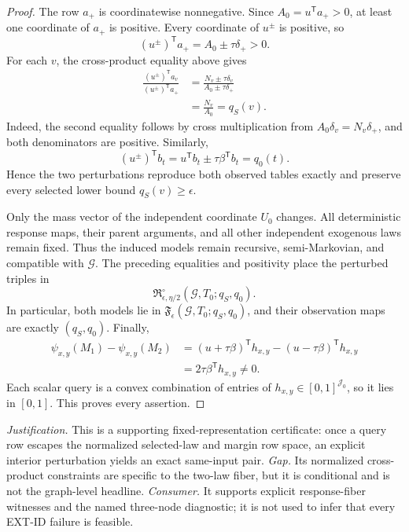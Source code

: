\documentclass{article}
\begin{document}
\begin{proof}
The row \(a_+\) is coordinatewise nonnegative. Since \(A_0=u^{\mathsf T}a_+>0\), at least one coordinate of \(a_+\) is positive. Every coordinate of \(u^\pm\) is positive, so
\[
 (u^\pm)^{\mathsf T}a_+=A_0\pm\tau\delta_+>0.
\]
For each \(v\), the cross-product equality above gives
\[
 \begin{aligned}
 \frac{(u^\pm)^{\mathsf T}a_v}{(u^\pm)^{\mathsf T}a_+}
 &=\frac{N_v\pm\tau\delta_v}{A_0\pm\tau\delta_+}\\
 &=\frac{N_v}{A_0}=q_S(v).
 \end{aligned}
\]
Indeed, the second equality follows by cross multiplication from \(A_0\delta_v=N_v\delta_+\), and both denominators are positive. Similarly,
\[
 (u^\pm)^{\mathsf T}b_t
 =u^{\mathsf T}b_t\pm\tau\beta^{\mathsf T}b_t
 =q_0(t).
\]
Hence the two perturbations reproduce both observed tables exactly and preserve every selected lower bound \(q_S(v)\geq\epsilon\).

Only the mass vector of the independent coordinate \(U_0\) changes. All deterministic response maps, their parent arguments, and all other independent exogenous laws remain fixed. Thus the induced models remain recursive, semi-Markovian, and compatible with \(\mathcal G\). The preceding equalities and positivity place the perturbed triples in
\[
 \mathfrak R_{\epsilon,\eta/2}^{\circ}(\mathcal G,T_0;q_S,q_0).
\]
In particular, both models lie in \(\mathfrak F_\epsilon(\mathcal G,T_0;q_S,q_0)\), and their observation maps are exactly \((q_S,q_0)\). Finally,
\[
 \begin{aligned}
 \psi_{x,y}(M_1)-\psi_{x,y}(M_2)
 &=(u+\tau\beta)^{\mathsf T}h_{x,y}-(u-\tau\beta)^{\mathsf T}h_{x,y}\\
 &=2\tau\beta^{\mathsf T}h_{x,y}\ne0.
 \end{aligned}
\]
Each scalar query is a convex combination of entries of \(h_{x,y}\in[0,1]^{\mathcal J_0}\), so it lies in \([0,1]\). This proves every assertion.
\end{proof}
\par\smallskip\noindent \textit{Justification.} This is a supporting fixed-representation certificate: once a query row escapes the normalized selected-law and margin row space, an explicit interior perturbation yields an exact same-input pair. \textit{Gap.} Its normalized cross-product constraints are specific to the two-law fiber, but it is conditional and is not the graph-level headline. \textit{Consumer.} It supports explicit response-fiber witnesses and the named three-node diagnostic; it is not used to infer that every EXT-ID failure is feasible.
\end{document}
